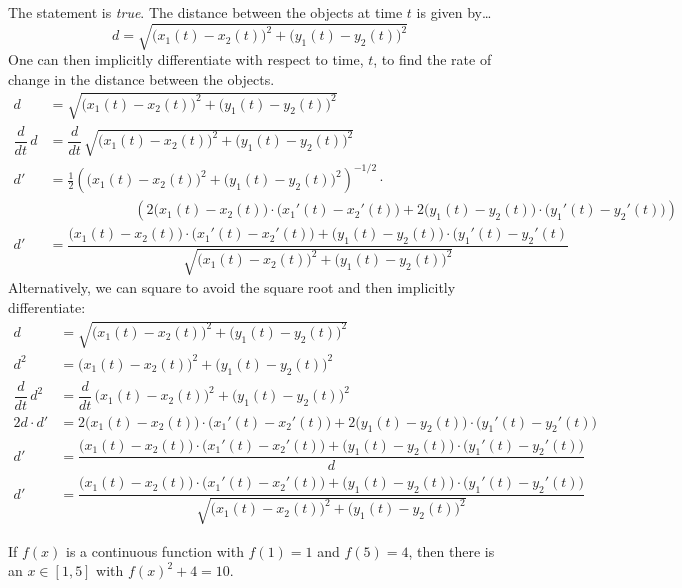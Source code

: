 \documentclass[11pt,letterpaper]{article}
\begin{document}
\sol The statement is \textit{true}. The distance between the objects at time $t$ is given by\dots
	\[
	d= \sqrt{ \big(x_1(t) - x_2(t) \big)^2 + \big(y_1(t) - y_2(t) \big)^2}
	\]
One can then implicitly differentiate with respect to time, $t$, to find the rate of change in the distance between the objects. 
	\[
	\begin{aligned}
	d&= \sqrt{ \big(x_1(t) - x_2(t) \big)^2 + \big(y_1(t) - y_2(t) \big)^2} \\[0.2cm]
	\dfrac{d}{dt} \, d&= \dfrac{d}{dt}\, \sqrt{ \big(x_1(t) - x_2(t) \big)^2 + \big(y_1(t) - y_2(t) \big)^2} \\[0.2cm]
	d'&= \frac{1}{2} \left( \big(x_1(t) - x_2(t) \big)^2 + \big(y_1(t) - y_2(t) \big)^2 \right)^{-1/2} \cdot \\[0.2cm]
	\phantom{d'}&\phantom{= -----} \left( 2 \big(x_1(t) - x_2(t) \big) \cdot \big(x_1'(t) - x_2'(t) \big) + 2 \big( y_1(t) - y_2(t) \big) \cdot \big( y_1'(t) - y_2'(t) \big) \right)  \\[0.2cm]
	d'&= \dfrac{\big(x_1(t) - x_2(t) \big) \cdot \big(x_1'(t) - x_2'(t) \big) + \big( y_1(t) - y_2(t) \big) \cdot \big( y_1'(t) - y_2'(t)}{\sqrt{\big(x_1(t) - x_2(t) \big)^2 + \big(y_1(t) - y_2(t) \big)^2}}
	\end{aligned}
	\]
Alternatively, we can square to avoid the square root and then implicitly differentiate: 
	\[
	\begin{aligned}
	d&= \sqrt{ \big(x_1(t) - x_2(t) \big)^2 + \big(y_1(t) - y_2(t) \big)^2} \\[0.2cm]
	d^2&= \big(x_1(t) - x_2(t) \big)^2 + \big(y_1(t) - y_2(t) \big)^2 \\[0.2cm]
	\dfrac{d}{dt}\, d^2 &= \dfrac{d}{dt}\, \big(x_1(t) - x_2(t) \big)^2 + \big(y_1(t) - y_2(t) \big)^2 \\[0.2cm]
	2d \cdot d' &= 2 \big(x_1(t) - x_2(t) \big) \cdot \big(x_1'(t) - x_2'(t) \big) + 2 \big(y_1(t) - y_2(t) \big) \cdot \big(y_1'(t) - y_2'(t) \big) \\[0.2cm]
	d' &= \dfrac{\big(x_1(t) - x_2(t) \big) \cdot \big(x_1'(t) - x_2'(t) \big) + \big(y_1(t) - y_2(t) \big) \cdot \big(y_1'(t) - y_2'(t) \big)}{d} \\[0.2cm]
	d' &= \dfrac{\big(x_1(t) - x_2(t) \big) \cdot \big(x_1'(t) - x_2'(t) \big) + \big(y_1(t) - y_2(t) \big) \cdot \big(y_1'(t) - y_2'(t) \big)}{\sqrt{ \big(x_1(t) - x_2(t) \big)^2 + \big(y_1(t) - y_2(t) \big)^2}}
	\end{aligned}
	\] \pvspace{1.3cm}



 If $f(x)$ is a continuous function with $f(1)= 1$ and $f(5)= 4$, then there is an $x \in [1, 5]$ with $f(x)^2 + 4= 10$.  \pspace
\end{document}
